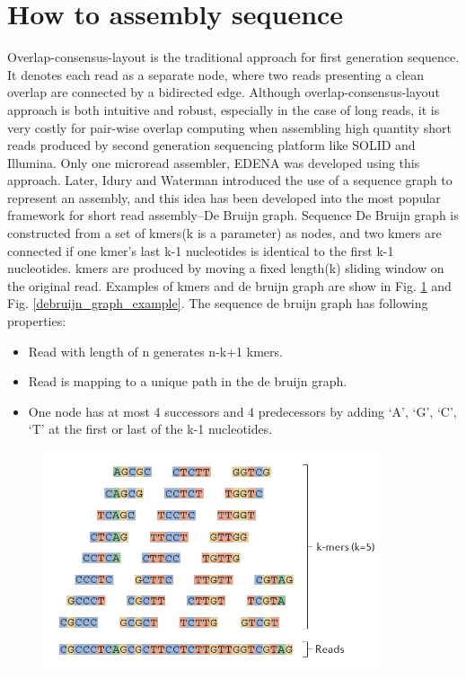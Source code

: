 \documentclass{article}
\begin{document}
\section{How to assembly sequence}
Overlap-consensus-layout \cite{myers1995toward} is the traditional approach for first generation sequence. It denotes each read as a separate node, where two reads presenting a clean overlap are connected by a bidirected edge. Although overlap-consensus-layout approach is both intuitive and robust, especially in the case of long reads, it is very costly for pair-wise overlap computing when assembling high quantity short reads produced by second generation sequencing platform like SOLID and Illumina. Only one microread assembler, EDENA \cite{hernandez2008novo} was developed using this approach. Later, Idury and Waterman \cite{idury1995new} introduced the use of a sequence graph to represent an assembly, and this idea has been developed into the most popular framework for short read assembly--De Bruijn graph. Sequence De Bruijn graph is constructed from a set of kmers(k is a parameter) as nodes, and two kmers are connected if one kmer's last k-1 nucleotides is identical to the first k-1 nucleotides. kmers are produced by moving a fixed length(k) sliding window on the original read. Examples of kmers and de bruijn graph are show in Fig. \ref{kmer_example} and Fig. \ref{debruijn_graph_example}. The sequence de bruijn graph has following properties:
\begin{itemize}
 \item Read with length of n generates n-k+1 kmers.
 \item Read is mapping to a unique path in the de bruijn graph.
 \item One node has at most 4 successors and 4 predecessors by adding `A', `G', `C', `T' at the first or last of the k-1 nucleotides.
\end{itemize}
\begin{figure}[ht]
  \centering
  \includegraphics[width=10cm]{Figure5.jpg}\\
  \caption{}\label{kmer_example}
\end{figure}
\end{document}

